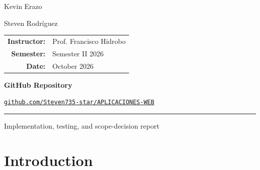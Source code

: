 \documentclass[11pt,a4paper]{article}
\begin{document}
\begin{titlepage}
{\Large
Kevin Erazo
\par}

\vspace{0.15cm}

{\Large
Steven Rodríguez
\par}

\vspace{1.15cm}

\begin{minipage}{0.62\textwidth}
\centering

\renewcommand{\arraystretch}{1.45}

\begin{tabular}{>{\bfseries}r l}
Instructor: & Prof. Francisco Hidrobo \\
Semester:   & Semester II 2026 \\
Date:       & October 2026 \\
\end{tabular}

\end{minipage}

\vspace{1.25cm}

{\small
\color{textgray}
\textbf{GitHub Repository}
\par}

\vspace{0.25cm}

\href{https://github.com/Steven735-star/APLICACIONES-WEB}
{
    \color{accent}
    \texttt{github.com/Steven735-star/APLICACIONES-WEB}
}

\vfill

{\color{accent}
\rule{0.82\textwidth}{0.8pt}
\par}

\vspace{0.35cm}

{\small
\color{textgray}
Implementation, testing, and scope-decision report
\par}

\vspace{0.45cm}

\end{titlepage}


\tableofcontents
\newpage

\section{Introduction}
\end{document}
